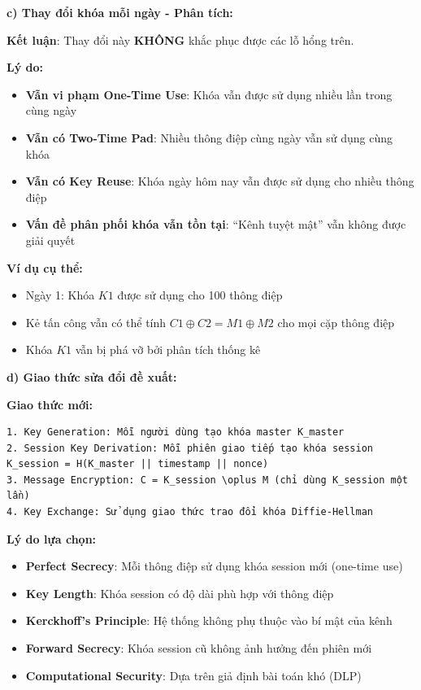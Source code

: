 \textbf{c) Thay đổi khóa mỗi ngày - Phân tích:}

\textbf{Kết luận}: Thay đổi này \textbf{KHÔNG} khắc phục được các lỗ hổng trên.

\textbf{Lý do:}
\begin{itemize}
    \item \textbf{Vẫn vi phạm One-Time Use}: Khóa vẫn được sử dụng nhiều lần trong cùng ngày
    \item \textbf{Vẫn có Two-Time Pad}: Nhiều thông điệp cùng ngày vẫn sử dụng cùng khóa
    \item \textbf{Vẫn có Key Reuse}: Khóa ngày hôm nay vẫn được sử dụng cho nhiều thông điệp
    \item \textbf{Vấn đề phân phối khóa vẫn tồn tại}: ``Kênh tuyệt mật'' vẫn không được giải quyết
\end{itemize}

\textbf{Ví dụ cụ thể:}
\begin{itemize}
    \item Ngày 1: Khóa $K1$ được sử dụng cho 100 thông điệp
    \item Kẻ tấn công vẫn có thể tính $C1 \oplus C2 = M1 \oplus M2$ cho mọi cặp thông điệp
    \item Khóa $K1$ vẫn bị phá vỡ bởi phân tích thống kê
\end{itemize}

\textbf{d) Giao thức sửa đổi đề xuất:}

\textbf{Giao thức mới:}
\begin{verbatim}
1. Key Generation: Mỗi người dùng tạo khóa master K_master
2. Session Key Derivation: Mỗi phiên giao tiếp tạo khóa session K_session = H(K_master || timestamp || nonce)
3. Message Encryption: C = K_session \oplus M (chỉ dùng K_session một lần)
4. Key Exchange: Sử dụng giao thức trao đổi khóa Diffie-Hellman
\end{verbatim}

\textbf{Lý do lựa chọn:}
\begin{itemize}
    \item \textbf{Perfect Secrecy}: Mỗi thông điệp sử dụng khóa session mới (one-time use)
    \item \textbf{Key Length}: Khóa session có độ dài phù hợp với thông điệp
    \item \textbf{Kerckhoff's Principle}: Hệ thống không phụ thuộc vào bí mật của kênh
    \item \textbf{Forward Secrecy}: Khóa session cũ không ảnh hưởng đến phiên mới
    \item \textbf{Computational Security}: Dựa trên giả định bài toán khó (DLP)
\end{itemize}

